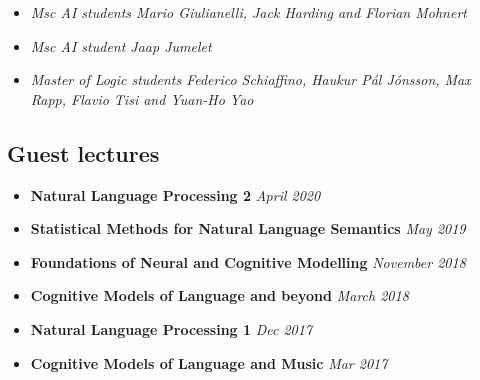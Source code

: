 {{{{{{{{{
{\begin{itemize}
  \item[] \textit{Msc AI students Mario Giulianelli, Jack Harding and Florian Mohnert}
\end{itemize}}}

{
{\begin{itemize}
  \item[] \textit{Msc AI student Jaap Jumelet}
\end{itemize}}}


{
{\begin{itemize}
  \item[] \textit{Master of Logic students Federico Schiaffino, Haukur Pál Jónsson, Max Rapp, Flavio Tisi and Yuan-Ho Yao}
\end{itemize}}}

\subsection{Guest lectures}

\begin{itemize}
\setlength\itemsep{3pt}
    \item \textbf{Natural Language Processing 2} \hfill \textit{April 2020}
    \item \textbf{Statistical Methods for Natural Language Semantics} \hfill \textit{May 2019}
    \item \textbf{Foundations of Neural and Cognitive Modelling} \hfill \textit{November 2018}
    \item \textbf{Cognitive Models of Language and beyond} \hfill \textit{March 2018}
    \item \textbf{Natural Language Processing 1} \hfill \textit{Dec 2017}
    \item \textbf{Cognitive Models of Language and Music} \hfill \textit{Mar 2017}
\end{itemize}

}}}}}}}}
